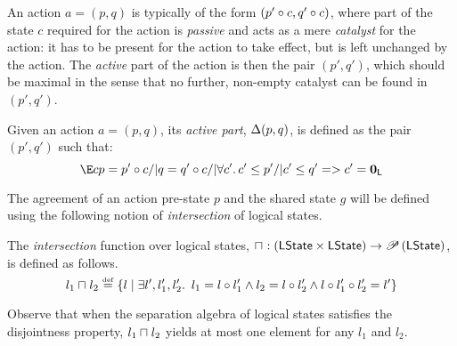 An action $a = (p, q)$ is typically of the form $(p'\circ c, q'\circ c)$, where part of the state $c$ required for the action is \emph{passive} and acts as a mere \emph{catalyst} for the action: it has to be present for the action to take effect, but is left unchanged by the action. The \emph{active} part of the action is then the pair $(p',q')$, which should be maximal in the sense that no further, non-empty catalyst can be found in $(p',q')$.
%
%
\begin{definition}
Given an action $a = (p, q)$, its \emph{active part}, $\Delta {(p,q)}$, is defined as the pair $(p', q')$ such that:
%
\[
	\E c p = p' \composeL c /| q = q' \composeL c /| \V{c'} c'\leq p' /|
  c'\leq q' => c' = \unitL
\]
%
\end{definition}
%
%
%
%
The agreement of an action pre-state $p$ and the shared state $g$ will be defined using the following notion of \emph{intersection} of logical states.
%
%
\begin{definition}[Intersection]
The \emph{intersection} function over logical states,
$
\sqcap_{} : \left(\textsf{LState} \times \textsf{LState} \right) \rightarrow \mathscr{P}\left(\textsf{LState} \right)
$, is defined as follows.
%
\[
	l_1 \sqcap_{} l_2 \mathrel{\stackrel{\smash{\scriptscriptstyle{\mathrm{def}}}}{=}} 
	\left\{ 
		l  \mid
		\exists l', l_1', l_2'.\,\ l_1 = l \circ l_1' \land l_2 = l \circ l_2' \land l \circ l_1' \circ l_2' = l'
	\right\}
\]
%
%
\end{definition}
%
Observe that when the separation algebra of logical states satisfies the disjointness property, $l_1\sqcap_{} l_2$ yields at most one element for any $l_1$ and $l_2$.

